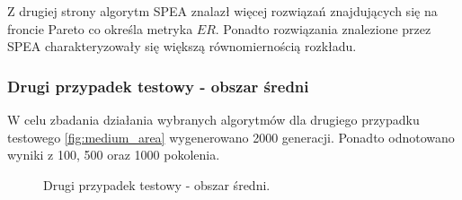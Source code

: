 \documentclass[twoside]{iisthesis}
\begin{document}
Z drugiej strony algorytm SPEA znalazł więcej rozwiązań znajdujących się na froncie Pareto co określa metryka $ER$. Ponadto rozwiązania znalezione przez SPEA charakteryzowały się większą równomiernością rozkładu.\newpage
\subsubsection{Drugi przypadek testowy - obszar średni}
W celu zbadania działania wybranych algorytmów dla drugiego przypadku testowego \eqref{fig:medium_area} wygenerowano 2000 generacji. Ponadto odnotowano wyniki z 100, 500 oraz 1000 pokolenia.
\begin{figure}[H]
	\centering
	\caption{Drugi przypadek testowy - obszar średni.}
	\label{fig:medium_area}
\end{figure}
\end{document}
